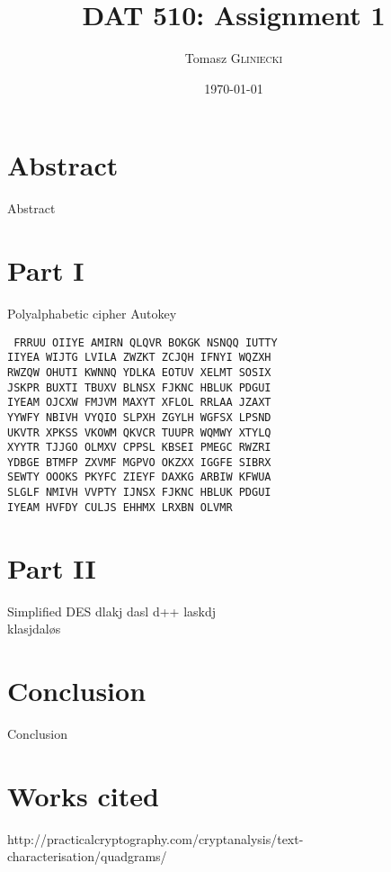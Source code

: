 \documentclass{article}
\title{DAT 510: Assignment 1} %
\author{Tomasz \textsc{Gliniecki}} %
\date{\today} %
\begin{document}
\maketitle %



\section*{Abstract}
Abstract

\section*{Part I}

Polyalphabetic cipher
Autokey
\begin{center}
\texttt{
FRRUU OIIYE AMIRN QLQVR BOKGK NSNQQ IUTTY\\
IIYEA WIJTG LVILA ZWZKT ZCJQH IFNYI WQZXH\\
RWZQW OHUTI KWNNQ YDLKA EOTUV XELMT SOSIX\\
JSKPR BUXTI TBUXV BLNSX FJKNC HBLUK PDGUI\\
IYEAM OJCXW FMJVM MAXYT XFLOL RRLAA JZAXT\\
YYWFY NBIVH VYQIO SLPXH ZGYLH WGFSX LPSND\\
UKVTR XPKSS VKOWM QKVCR TUUPR WQMWY XTYLQ\\
XYYTR TJJGO OLMXV CPPSL KBSEI PMEGC RWZRI\\
YDBGE BTMFP ZXVMF MGPVO OKZXX IGGFE SIBRX\\
SEWTY OOOKS PKYFC ZIEYF DAXKG ARBIW KFWUA\\
SLGLF NMIVH VVPTY IJNSX FJKNC HBLUK PDGUI\\
IYEAM HVFDY CULJS EHHMX LRXBN OLVMR\\
}
\end{center}
\section*{Part II}
Simplified DES dlakj dasl d++ laskdj \\klasjdaløs
\section*{Conclusion}
Conclusion
\section*{Works cited}
http://practicalcryptography.com/cryptanalysis/text-characterisation/quadgrams/
\end{document}
